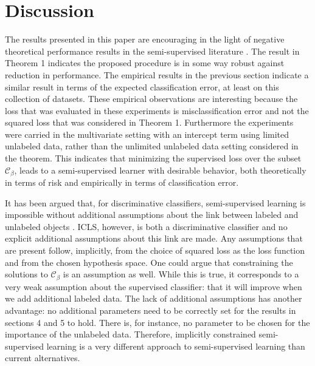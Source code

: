 \documentclass{llncs}
\newcommand{\Cb}{\mathcal{C}_{\beta}}
\begin{document}




\section{Discussion}
The results presented in this paper are encouraging in the light of negative theoretical performance results in the semi-supervised literature \cite{Cozman2006}. The result in Theorem 1 indicates the proposed procedure is in some way robust against reduction in performance. The empirical results in the previous section indicate a similar result in terms of the expected classification error, at least on this collection of datasets. These empirical observations are interesting because the loss that was evaluated in these experiments is misclassification error and not the squared loss that was considered in Theorem 1. Furthermore the experiments were carried in the multivariate setting with an intercept term using limited unlabeled data, rather than the unlimited unlabeled data setting considered in the theorem. This indicates that minimizing the supervised loss over the subset $\Cb$, leads to a semi-supervised learner with desirable behavior, both theoretically in terms of risk and empirically in terms of classification error.

It has been argued that, for discriminative classifiers, semi-supervised learning is impossible without additional assumptions about the link between labeled and unlabeled objects \cite{Seeger2001,Singh2008}. ICLS, however, is both a discriminative classifier and no explicit additional assumptions about this link are made. Any assumptions that are present follow, implicitly, from the choice of squared loss as the loss function and from the chosen hypothesis space. One could argue that constraining the solutions to $\Cb$ is an assumption as well. While this is true, it corresponds to a very weak assumption about the supervised classifier: that it will improve when we add additional labeled data. The lack of additional assumptions has another advantage: no additional parameters need to be correctly set for the results in sections 4 and 5 to hold. There is, for instance, no parameter to be chosen for the importance of the unlabeled data. Therefore, implicitly constrained semi-supervised learning is a very different approach to semi-supervised learning than current alternatives.
\end{document}
